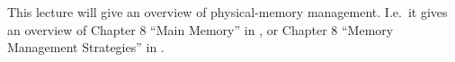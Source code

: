 This lecture will give an overview of physical-memory management.
I.e.\ it gives an overview of Chapter 8 ``Main Memory'' in 
\cite{Silberschatz2013intl,Silberschatz2013osc}, or Chapter 8 ``Memory 
Management Strategies'' in \cite{Silberschatz2009osc}.
